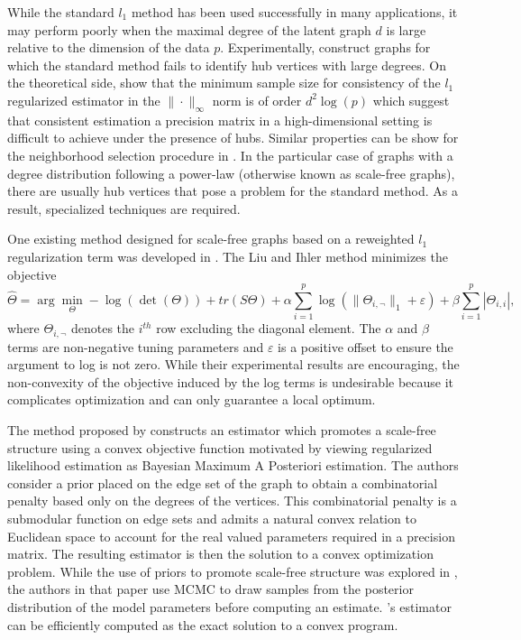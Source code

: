 \documentclass{uwstat572}
\theoremstyle{remark}
\theoremstyle{definition}
\begin{document}
While the standard $l_1$ method has been used successfully in many applications, it may perform poorly when the maximal degree of the latent graph $d$ is large relative to the dimension of the data $p$. Experimentally, \cite{Schaefer2005} construct graphs for which the standard method fails to identify hub vertices with large degrees. On the theoretical side, \cite{ravikumar2011} show that the minimum sample size for consistency of the $l_1$ regularized estimator in the $\| \cdot \|_{\infty}$ norm is of order $d^2 \log(p)$ which suggest that consistent estimation a precision matrix in a high-dimensional setting is difficult to achieve under the presence of hubs. Similar properties can be show for the neighborhood selection procedure in \cite{meinshausen2006}.  In the particular case of graphs with a degree distribution following a power-law (otherwise known as scale-free graphs), there are usually hub vertices that pose a problem for the standard method.  As a result, specialized techniques are required.

One existing method designed for scale-free graphs based on a reweighted $l_1$ regularization term was developed in \cite{liu11c}.  The Liu and Ihler method minimizes the objective
\begin{equation*}
    \widehat{\Theta} = \arg\min_{\Theta}  -\log( \det( \Theta)) + tr(S \Theta) + \alpha \sum_{i=1}^p \log( \| \Theta_{i,\neg}\|_1 + \varepsilon ) + \beta \sum_{i=1}^p |\Theta_{i,i}|,
\end{equation*}
where $\Theta_{i,\neg}$ denotes the $i^{th}$ row excluding the diagonal element.  The $\alpha$ and $\beta$ terms are non-negative tuning parameters and $\varepsilon$ is a positive offset to ensure the argument to log is not zero. While their experimental results are encouraging, the non-convexity of the objective induced by the log terms is undesirable because it complicates optimization and can only guarantee a local optimum.

The method proposed by \cite{Defazio2012} constructs an estimator which promotes a scale-free structure using a convex objective function motivated by viewing regularized likelihood estimation as Bayesian Maximum A Posteriori estimation.  The authors consider a prior placed on the edge set of the graph to obtain a combinatorial penalty based only on the degrees of the vertices. This combinatorial penalty is a submodular function on edge sets and admits a natural convex relation to Euclidean space to account for the real valued parameters required in a precision matrix. The resulting estimator is then the solution to a convex optimization problem. While the use of priors to promote scale-free structure was explored in \cite{sheridan2010}, the authors in that paper use MCMC to draw samples from the posterior distribution of the model parameters before computing an estimate.  \citet{Defazio2012}'s estimator can be efficiently computed as the exact solution to a convex program.
\end{document}
